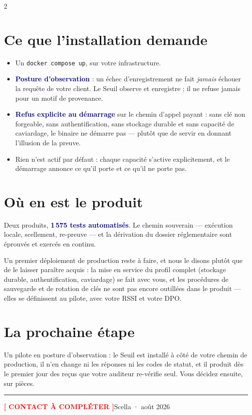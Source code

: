 \documentclass[11pt]{article}
\newcommand{\code}[1]{\texttt{\small #1}}
\newcommand{\mm}[1]{\textbf{\textcolor{navy}{#1}}}
\begin{document}
\begin{multicols}{2}
\section{Ce que l'installation demande}
\begin{itemize}[leftmargin=11pt,itemsep=1.5pt,topsep=2pt]
\item Un \code{docker compose up}, sur votre infrastructure.
\item \mm{Posture d'observation} : un échec d'enregistrement ne fait \emph{jamais} échouer la requête de votre client. Le Seuil observe et enregistre ; il ne refuse jamais pour un motif de provenance.
\item \mm{Refus explicite au démarrage} sur le chemin d'appel payant : sans clé non forgeable, sans authentification, sans stockage durable et sans capacité de caviardage, le binaire ne démarre pas — plutôt que de servir en donnant l'illusion de la preuve.
\item Rien n'est actif par défaut : chaque capacité s'active explicitement, et le démarrage annonce ce qu'il porte et ce qu'il ne porte pas.
\end{itemize}

\section{Où en est le produit}
Deux produits, \mm{1\,575 tests automatisés}. Le chemin souverain — exécution locale, scellement, re-preuve — et la dérivation du dossier réglementaire sont éprouvés et exercés en continu.

Un premier déploiement de production reste à faire, et nous le disons plutôt que de le laisser paraître acquis : la mise en service du profil complet (stockage durable, authentification, caviardage) se fait avec vous, et les procédures de sauvegarde et de rotation de clés ne sont pas encore outillées dans le produit — elles se définissent au pilote, avec votre RSSI et votre DPO.

\section{La prochaine étape}
Un pilote en posture d'observation : le Seuil est installé à côté de votre chemin de production, il n'en change ni les réponses ni les codes de statut, et il produit dès le premier jour des reçus que votre auditeur re-vérifie seul. Vous décidez ensuite, sur pièces.

\vspace{3pt}
\hrule\vspace{3pt}
{\footnotesize\color{grey}\textbf{\textcolor{red}{[ CONTACT À COMPLÉTER ]}}\hfill Scella · août 2026}

\end{multicols}
\end{document}

